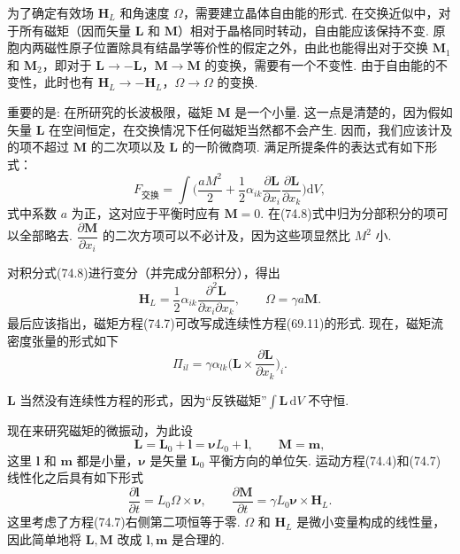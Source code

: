 为了确定有效场 $\bm{H}_L$ 和角速度 $\bm{\varOmega}$，需要建立晶体自由能的形式. 在交换近似中，对于所有磁矩（因而矢量 $\bm{L}$ 和 $\bm{M}$）相对于晶格同时转动，自由能应该保持不变. 原胞内两磁性原子位置除具有结晶学等价性的假定之外，由此也能得出对于交换 $\bm{M}_1$ 和 $\bm{M}_2$，即对于 $\bm{L}\to-\bm{L}$，$\bm{M}\to\bm{M}$ 的变换，需要有一个不变性. 由于自由能的不变性，此时也有 $\bm{H}_L\to-\bm{H}_L$，$\bm{\varOmega}\to\bm{\varOmega}$ 的变换.

重要的是: 在所研究的长波极限，磁矩 $\bm{M}$ 是一个小量. 这一点是清楚的，因为假如矢量 $\bm{L}$ 在空间恒定，在交换情况下任何磁矩当然都不会产生. 因而，我们应该计及的项不超过 $\bm{M}$ 的二次项以及 $\bm{L}$ 的一阶微商项. 满足所提条件的表达式有如下形式：
\begin{equation}
F_{\text{交换}}=\int\biggl(\frac{aM^2}{2}
+\frac{1}{2}\alpha_{ik}\frac{\partial\bm{L}}{\partial x_i}
\frac{\partial\bm{L}}{\partial x_k}\biggr)\mathrm{d}V,
\end{equation}
式中系数 $a$ 为正，这对应于平衡时应有 $\bm{M}=0$. 在(74.8)式中归为分部积分的项可以全部略去. $\dfrac{\partial\bm{M}}{\partial x_i}$ 的二次方项可以不必计及，因为这些项显然比 $M^2$ 小.

对积分式(74.8)进行变分（并完成分部积分），得出
\begin{equation}
\bm{H}_L=\frac{1}{2}\alpha_{ik}\frac{\partial^2\bm{L}}{\partial x_i\partial x_k},
\qquad\bm{\varOmega}=\gamma a\bm{M}.
\end{equation}
最后应该指出，磁矩方程(74.7)可改写成连续性方程(69.11)的形式. 现在，磁矩流密度张量的形式如下
\begin{equation*}
\varPi_{il}=\gamma\alpha_{lk}\biggl(\bm{L}\times\frac{\partial\bm{L}}{\partial x_k}\biggr)_{\!i}.
\end{equation*}

$\bm{L}$ 当然没有连续性方程的形式，因为“反铁磁矩”$\int\bm{L}\,\mathrm{d}V$ 不守恒.

现在来研究磁矩的微振动，为此设
\begin{equation*}
\bm{L}=\bm{L}_0+\bm{l}=\bm{\nu}L_0+\bm{l},\qquad\bm{M}=\bm{m},
\end{equation*}
这里 $\bm{l}$ 和 $\bm{m}$ 都是小量，$\bm{\nu}$ 是矢量 $\bm{L}_0$ 平衡方向的单位矢. 运动方程(74.4)和(74.7)线性化之后具有如下形式
\begin{equation}
\frac{\partial\bm{l}}{\partial t}=L_0\bm{\varOmega}\times\bm{\nu},\qquad
\frac{\partial\bm{M}}{\partial t}=\gamma L_0\bm{\nu}\times\bm{H}_L.
\end{equation}
这里考虑了方程(74.7)右侧第二项恒等于零. $\bm{\varOmega}$ 和 $\bm{H}_L$ 是微小变量构成的线性量，因此简单地将 $\bm{L},\bm{M}$ 改成 $\bm{l},\bm{m}$ 是合理的.

